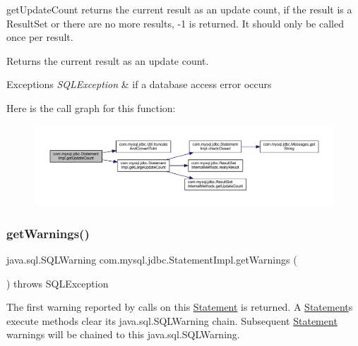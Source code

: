 get\+Update\+Count returns the current result as an update count, if the result is a Result\+Set or there are no more results, -\/1 is returned. It should only be called once per result.

\begin{DoxyReturn}{Returns}
the current result as an update count.
\end{DoxyReturn}

\begin{DoxyExceptions}{Exceptions}
{\em S\+Q\+L\+Exception} & if a database access error occurs \\
\hline
\end{DoxyExceptions}
Here is the call graph for this function\+:
\nopagebreak
\begin{figure}[H]
\begin{center}
\leavevmode
\includegraphics[width=350pt]{classcom_1_1mysql_1_1jdbc_1_1_statement_impl_a5e320d2717fe1d637befef4f837719b6_cgraph}
\end{center}
\end{figure}
\mbox{\label{classcom_1_1mysql_1_1jdbc_1_1_statement_impl_ab213540e1a8c3dc18168ef8b9cbfe29e}} 
\subsubsection{\texorpdfstring{get\+Warnings()}{getWarnings()}}
{\footnotesize\ttfamily java.\+sql.\+S\+Q\+L\+Warning com.\+mysql.\+jdbc.\+Statement\+Impl.\+get\+Warnings (\begin{DoxyParamCaption}{ }\end{DoxyParamCaption}) throws S\+Q\+L\+Exception}

The first warning reported by calls on this \mbox{\hyperlink{interfacecom_1_1mysql_1_1jdbc_1_1_statement}{Statement}} is returned. A \mbox{\hyperlink{interfacecom_1_1mysql_1_1jdbc_1_1_statement}{Statement}}\textquotesingle{}s execute methods clear its java.\+sql.\+S\+Q\+L\+Warning chain. Subsequent \mbox{\hyperlink{interfacecom_1_1mysql_1_1jdbc_1_1_statement}{Statement}} warnings will be chained to this java.\+sql.\+S\+Q\+L\+Warning.

